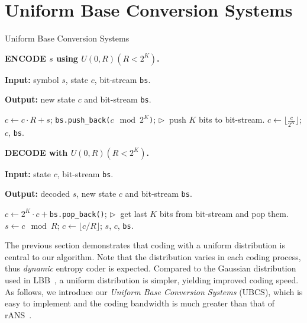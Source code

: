 \documentclass{article}
\begin{document}
\section{Uniform Base Conversion Systems}
\label{sec:uans}

\begin{algorithm}[h]
\small
\caption{Uniform Base Conversion Systems}
\begin{multicols}{2} 
\textbf{ENCODE $s$ using $U(0, R) (R < 2^K)$.} 

\textbf{Input:} symbol $s$, state $c$, bit-stream \texttt{bs}.

\textbf{Output:} new state $c$ and bit-stream \texttt{bs}.

\begin{algorithmic}[1]
\STATE $c \gets c \cdot R + s$;
\STATE \texttt{bs.push\_back($c \mod 2^K$)}; \quad $\triangleright ~$ push $K$ bits to bit-stream.
\STATE $c \gets \lfloor \frac{c}{2^K} \rfloor$;
\ENDIF
\RETURN $c$, \texttt{bs}.
\end{algorithmic}

\textbf{DECODE with $U(0, R) (R < 2^K)$.} 

\textbf{Input:} state $c$, bit-stream \texttt{bs}.

\textbf{Output:} decoded $s$, new state $c$ and bit-stream \texttt{bs}.

\begin{algorithmic}[1]
\STATE $c \gets 2^K \cdot c + $\texttt{bs.pop\_back()}; \quad $\triangleright ~$ get last $K$ bits from bit-stream and pop them.
\ENDIF
\STATE $s \gets c \mod R$;
\STATE $c \gets \lfloor c/R \rfloor$;
\RETURN $s$, $c$, \texttt{bs}.
\end{algorithmic}
\end{multicols}
\vspace{-8pt}
\label{alg:uans}
\end{algorithm}

The previous section demonstrates that coding with a uniform distribution is central to our algorithm. Note that the distribution varies in each coding process, thus {\em dynamic} entropy coder is expected. Compared to the Gaussian distribution used in LBB~\cite{ho2019compression}, a uniform distribution is simpler, yielding improved coding speed. As follows, we introduce our \textit{Uniform Base Conversion Systems} (UBCS), which is easy to implement and the coding bandwidth is much greater than that of rANS~\cite{duda2013asymmetric}.
\end{document}
